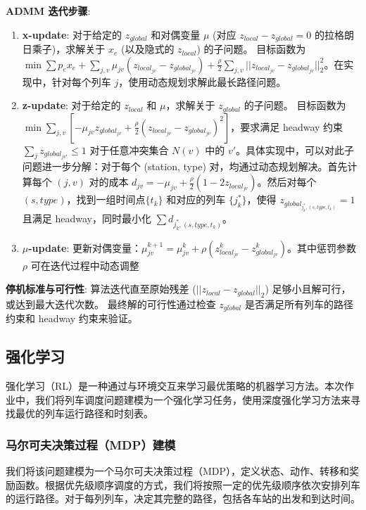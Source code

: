 \documentclass{article}
\begin{document}
    \textbf{ADMM 迭代步骤}:
    \begin{enumerate}
        \item \textbf{x-update}:
        对于给定的 $z_{global}$ 和对偶变量 $\mu$ (对应
        $z_{local} - z_{global} = 0$ 的拉格朗日乘子)，求解关于
        $x_e$ (以及隐式的 $z_{local}$) 的子问题。
        目标函数为 $\min \sum p_e x_e + \sum_{j,v} \mu_{jv}
        (z_{local_{jv}} - z_{global_{jv}}) +
        \frac{\rho}{2} \sum_{j,v} ||z_{local_{jv}} -
        z_{global_{jv}}||_2^2$。在实现中，针对每个列车
        $j$，使用动态规划求解此最长路径问题。
        \item \textbf{z-update}:
        对于给定的 $z_{local}$ 和 $\mu$，求解关于 $z_{global}$ 的子问题。
        目标函数为 $\min \sum_{j,v} [-\mu_{jv}
        z_{global_{jv}} + \frac{\rho}{2}
        (z_{local_{jv}} - z_{global_{jv}})^2]$，要求满足
        headway 约束 $\sum_{j} z_{global_{jv'}} \le 1$
        对于任意冲突集合 $N(v)$ 中的 $v'$。具体实现中，可以对此子问题进一步分解：对于每个 (station, type)
        对，均通过动态规划解决。首先计算每个 $(j,v)$ 对的成本 $d_{jv} =-\mu_{jv} +
        \frac{\rho}{2} (1 - 2
        z_{local_{jv}})$。然后对每个 $(s, type)$，找到一组时间点$\{t_k\}$ 和对应的列车
        $\{j_k^*\}$，使得
        $z_{global_{j_k^*, (s,type,t_k)}}=1$ 且满足 headway，同时最小化 $\sum
        d_{j_k^*, (s,type,t_k)}$。
        \item \textbf{$\mu$-update}:
        更新对偶变量：$\mu_{jv}^{k+1} = \mu_{jv}^k + \rho
        (z_{local_{jv}}^k - z_{global_{jv}}^k)$。其中惩罚参数 $\rho$ 可在迭代过程中动态调整
    \end{enumerate}

    \textbf{停机标准与可行性}:
    算法迭代直至原始残差 ($||z_{local} - z_{global}||_2$) 足够小且解可行，或达到最大迭代次数。
    最终解的可行性通过检查 $z_{global}$ 是否满足所有列车的路径约束和 headway 约束来验证。

    \subsection{强化学习}

    强化学习（RL）是一种通过与环境交互来学习最优策略的机器学习方法。本次作业中，我们将列车调度问题建模为一个强化学习任务，使用深度强化学习方法来寻找最优的列车运行路径和时刻表。

    \subsubsection{马尔可夫决策过程（MDP）建模}
    我们将该问题建模为一个马尔可夫决策过程（MDP），定义状态、动作、转移和奖励函数。根据优先级顺序调度的方式，我们将按照一定的优先级顺序依次安排列车的运行路径。对于每列列车，决定其完整的路径，包括各车站的出发和到达时间。
\end{document}

